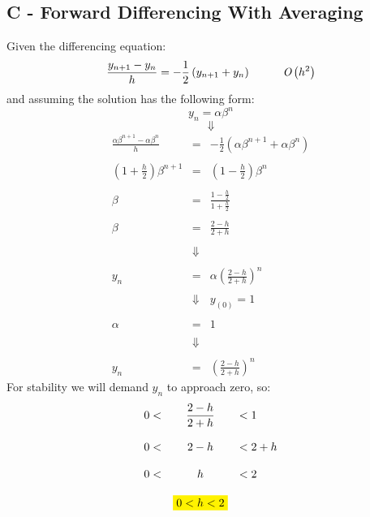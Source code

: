 \documentclass[11pt, a4paper]{article}
\begin{document}
\subsection{C - Forward Differencing With Averaging}
Given the differencing equation:
\begin{equation}
    \frac{y_{n+1}-y_{n}}{h}=-\frac{1}{2}\left(y_{n+1}+y_n\right)\hspace{1cm}\emph{O}\left(h^2\right)
\end{equation}
and assuming the solution has the following form:
\begin{equation}
    y_n=\alpha\beta^n
\end{equation}
\begin{equation*}
    \Downarrow
\end{equation*}
\begin{equation}
    \begin{array}{rcl}
        \displaystyle\frac{\alpha\beta^{n+1}-\alpha\beta^{n}}{h} & = & \displaystyle-\frac{1}{2}\left(\alpha\beta^{n+1}+\alpha\beta^n\right) \\\\
        \displaystyle\left(1+\frac{h}{2}\right)\beta^{n+1} & = & \displaystyle\left(1-\frac{h}{2}\right)\beta^n \\\\
        \beta & = & \displaystyle\frac{\displaystyle1-\frac{h}{2}}{\displaystyle1+\frac{h}{2}} \\\\
        \beta & = & \displaystyle\frac{2-h}{2+h} \\\\
        & \Downarrow & \\\\
        y_n & = & \alpha\left(\displaystyle\frac{2-h}{2+h}\right)^n \\\\
        & \Downarrow & y_{\left(0\right)}=1 \\\\
        \alpha & = & 1 \\\\
        & \Downarrow & \\\\
        y_n & = & \left(\displaystyle\frac{2-h}{2+h}\right)^n
    \end{array}
\end{equation}
For stability we will demand $y_n$ to approach zero, so:
\begin{equation}
    \begin{array}{rcl}
        0<&\displaystyle\frac{2-h}{2+h}&<1 \\\\
        0<&2-h&<2+h \\\\
        0<&h&<2 \\\\
        &\colorbox{yellow}{$0<h<2$}&
    \end{array}
\end{equation}
\end{document}

